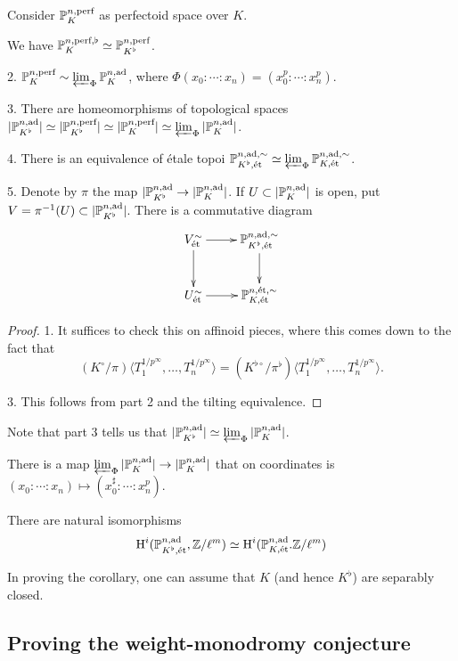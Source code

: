 Consider $\mathbb{P}_K^{n,\textnormal{perf}}$ as perfectoid space over $K$. 

\begin{theorem}
We have $\mathbb{P}_K^{n,\textnormal{perf},\flat} \simeq \mathbb{P}_{K^\flat}^{n,\textnormal{perf}}$. 

2. $\mathbb{P}_K^{n,\textnormal{perf}} \sim \varprojlim_\Phi \mathbb{P}_K^{n,\textnormal{ad}}$, where 
$\Phi(x_0:\cdots:x_n) = (x_0^p:\cdots:x_n^p)$. 

3. There are homeomorphisms of topological spaces 
$|\mathbb{P}_{K^\flat}^{n,\textnormal{ad}}| \simeq |\mathbb{P}_{K^\flat}^{n,\textnormal{perf}}|\simeq |\mathbb{P}_K^{n,\textnormal{perf}}| \simeq \varprojlim_\Phi |\mathbb{P}_K^{n,\textnormal{ad}}|$. 

4. There is an equivalence of \'etale topoi 
$\mathbb{P}_{K^\flat,\textnormal{\'et}}^{n,\textnormal{ad},\sim}\simeq \varprojlim_\Phi \mathbb{P}_{K,\textnormal{\'et}}^{n,\textnormal{ad},\sim}$. 

5. Denote by $\pi$ the map 
$|\mathbb{P}_{K^\flat}^{n,\textnormal{ad}} \to |\mathbb{P}_K^{n,\textnormal{ad}}|$. If 
$U\subset |\mathbb{P}_K^{n,\textnormal{ad}}|$ is open,  put $V=\pi^{-1}(U)\subset |\mathbb{P}_{K^\flat}^{n,\textnormal{ad}}|$.
There is a commutative diagram 
\[\xymatrix{
  V_\et^\sim \ar[r] \ar[d] 
    & \dP_{K^\flat,\et}^{n,\ad,\sim} \ar[d] \\
  U_\et^\sim \ar[r] 
    & \dP_{K,\et}^{n,\et,\sim} 
 }\] 
\end{theorem}
\begin{proof}
1. It suffices to check this on affinoid pieces, where this comes down to the 
fact that 
\[
  (K^\circ/\pi)\langle T_1^{1/p^\infty},\dots,T_n^{1/p^\infty}\rangle = (K^{\flat \circ}/\pi^\flat) \langle T_1^{1/p^\infty},\dots,T_n^{1/p^\infty}\rangle . 
\]

3. This follows from part 2 and the tilting equivalence. 
\end{proof}

Note that part 3 tells us that $|\mathbb{P}_{K^\flat}^{n,\textnormal{ad}}|\simeq \varprojlim_\Phi |\mathbb{P}_K^{n,\textnormal{ad}}|$. 

There is a map $\varprojlim_\Phi |\mathbb{P}_K^{n,\textnormal{ad}}| \to |\mathbb{P}_K^{n,\textnormal{ad}}|$ that on 
coordinates is $(x_0:\cdots:x_n)\mapsto (x_0^\sharp:\cdots : x_n^p)$. 

\begin{corollary}
There are natural isomorphisms 
\[
  \operatorname{H}^i(\mathbb{P}_{K^\flat,\textnormal{\'et}}^{n,\textnormal{ad}},\mathbb{Z}/\ell^m) \simeq \operatorname{H}^i(\mathbb{P}_{K,\textnormal{\'et}}^{n,\textnormal{ad}}.\mathbb{Z}/\ell^m) 
\]
\end{corollary}
In proving the corollary, one can assume that $K$ (and hence $K^\flat$) are 
separably closed. 





\subsection{Proving the weight-monodromy conjecture}


